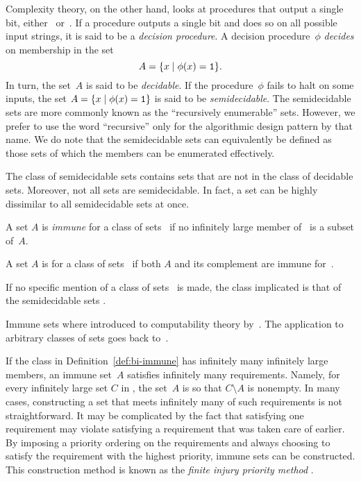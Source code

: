 Complexity theory, on the other hand, looks at procedures that output a single bit, either~ or~.
If a procedure outputs a single bit and does so on all possible input strings, it is said to be a \emph{decision procedure}.
A decision procedure~$\phi$ \emph{decides} on membership in the set
\begin{equation*}
  A = \{x \;|\; \phi(x) = \textnormal{\texttt{1}}\}.
\end{equation*}
In turn, the set~$A$ is said to be \emph{decidable}.
If the procedure~$\phi$ fails to halt on some inputs, the set $A = \{x \;|\; \phi(x) = \textnormal{\texttt{1}}\}$ is said to be \emph{semidecidable}.
The semidecidable sets are more commonly known as the \enquote{recursively enumerable} sets.
However, we prefer to use the word \enquote{recursive} only for the algorithmic design pattern by that name.
We do note that the semidecidable sets can equivalently be defined as those sets of which the members can be enumerated effectively.

The class of semidecidable sets contains sets that are not in the class of decidable sets.
Moreover, not all sets are semidecidable.
In fact, a set can be highly dissimilar to all semidecidable sets at once.
\begin{definition}
\label{def:bi-immune}%
  A set $A$ is \emph{immune} for a class of sets~ if no infinitely large member of~ is a subset of~$A$.

  A set $A$ is  for a class of sets~ if both $A$ and its complement are immune for~.

  If no specific mention of a class of sets~ is made, the class implicated is that of the semidecidable sets \parencite{rogers1967theory,odifreddi1992classical}.
\end{definition}
Immune sets where introduced to computability theory by~\textcite{post1944recursively}.
The application to arbitrary classes of sets goes back to~\textcite{flajolet1974sets}.

If the class  in Definition~\ref{def:bi-immune} has infinitely many infinitely large members, an immune set~$A$ satisfies infinitely many requirements.
Namely, for every infinitely large set $C$ in , the set~$A$ is so that $C \setminus A$ is nonempty.
In many cases, constructing a set that meets infinitely many of such requirements is not straightforward.
It may be complicated by the fact that satisfying one requirement may violate satisfying a requirement that was taken care of earlier.
By imposing a priority ordering on the requirements and always choosing to satisfy the requirement with the highest priority, immune sets can be constructed.
This construction method is known as the \emph{finite injury priority method} \parencite[for details, see][Section~2.11]{downey2010algorithmic}.

